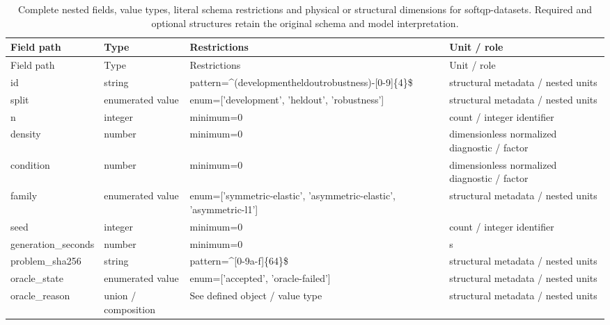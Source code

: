 \begingroup\footnotesize\setlength{\tabcolsep}{3pt}
\begin{longtable}{@{}>{\raggedright\arraybackslash}p{}>{\raggedright\arraybackslash}p{}>{\raggedright\arraybackslash}p{}>{\raggedright\arraybackslash}p{}@{}}
\caption{Complete nested fields, value types, literal schema restrictions and physical or structural dimensions for softqp-datasets. Required and optional structures retain the original schema and model interpretation.}\label{tab:nested-softqp-datasets}\\
\toprule Field path & Type & Restrictions & Unit / role\\\midrule\endfirsthead
\toprule Field path & Type & Restrictions & Unit / role\\\midrule\endhead
\bottomrule\endfoot
id & string & pattern=\allowbreak{}\textasciicircum{}(development\textbar{}\allowbreak{}heldout\textbar{}\allowbreak{}robustness)-[0-9]\{4\}\$ & structural metadata /\allowbreak{} nested units\\
split & enumerated value & enum=\allowbreak{}['development', 'heldout', 'robustness'] & structural metadata /\allowbreak{} nested units\\
n & integer & minimum=\allowbreak{}0 & count /\allowbreak{} integer identifier\\
density & number & minimum=\allowbreak{}0 & dimensionless normalized diagnostic /\allowbreak{} factor\\
condition & number & minimum=\allowbreak{}0 & dimensionless normalized diagnostic /\allowbreak{} factor\\
family & enumerated value & enum=\allowbreak{}['symmetric-\allowbreak{}elastic', 'asymmetric-\allowbreak{}elastic', 'asymmetric-\allowbreak{}l1'] & structural metadata /\allowbreak{} nested units\\
seed & integer & minimum=\allowbreak{}0 & count /\allowbreak{} integer identifier\\
generation\_\allowbreak{}seconds & number & minimum=\allowbreak{}0 & s\\
problem\_\allowbreak{}sha256 & string & pattern=\allowbreak{}\textasciicircum{}[0-9a-\allowbreak{}f]\{64\}\$ & structural metadata /\allowbreak{} nested units\\
oracle\_\allowbreak{}state & enumerated value & enum=\allowbreak{}['accepted', 'oracle-\allowbreak{}failed'] & structural metadata /\allowbreak{} nested units\\
oracle\_\allowbreak{}reason & union /\allowbreak{} composition & See defined object /\allowbreak{} value type & structural metadata /\allowbreak{} nested units\\

\end{longtable}
